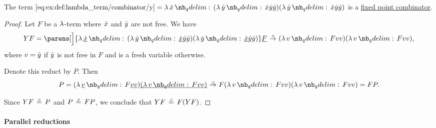 \begin{proposition}\label{thm:y_is_a_fixed_point_combinator}
  The term \( \ref{eq:ex:def:lambda_term/combinator/y} = \qabs \synx (\qabs \syny \synx \syny \syny) (\qabs \syny \synx \syny \syny) \) is a \hyperref[def:fixed_point_combinator]{fixed point combinator}.
\end{proposition}
\begin{proof}
  Let \( F \) be a \( \mathrm{\lambda} \)-term where \( {\dot{x}} \) and \( {\dot{y}} \) are not free. We have
  \begin{equation*}
    YF
    =
    \parens[\Big]{ \qabs {\hi{\synx}} (\qabs \syny \hi{\synx} \syny \syny) (\qabs \syny \hi{\synx} \syny \syny) } \hi{F}
    \bred
    (\qabs v F v v) (\qabs v F v v),
  \end{equation*}
  where \( v = {\dot{y}} \) if \( {\dot{y}} \) is not free in \( F \) and is a fresh variable otherwise.

  Denote this reduct by \( P \). Then
  \begin{equation*}
    P =
    (\qabs {\hi{v}} F \hi{v} \hi{v}) \hi{(\qabs v F v v)}
    \bred
    F (\qabs v F v v) (\qabs v F v v)
    =
    FP.
  \end{equation*}

  Since \( YF \bequiv P \) and \( P \bequiv FP \), we conclude that \( YF \bequiv F(YF) \).
\end{proof}

\paragraph{Parallel reductions}

